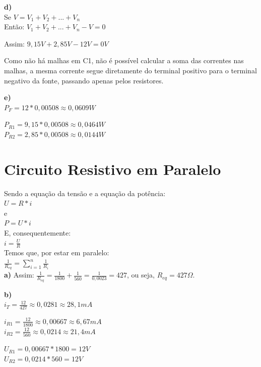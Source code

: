 \documentclass[
		12pt, %
		oneside, %
		a4paper, %
		article, %
		chapter=TITLE, %
		section=TITLE, %
		subsection=TITLE, %
		english, %
		spanish, %
		brazil %
]{abntex2} %
\numberwithin{equation}{section}
\numberwithin{figure}{section}
\numberwithin{table}{section}
\begin{document}
	\textbf{d)} \\
	Se $V = V_1 + V_2 + ... + V_n$ \\
	Então: $V_1 + V_2 + ... + V_n - V = 0$

	Assim: $9,15V + 2,85V - 12V = 0V$

	Como não há malhas em C1, não é possível calcular a soma das correntes nas malhas, a mesma corrente segue diretamente do terminal positivo para o terminal negativo da fonte, passando apenas pelos resistores.
	\linebreak

	\textbf{e)} \\
	$P_F = 12 * 0,00508 \approx 0,0609 W$

	$P_{R1} = 9,15 * 0,00508 \approx 0,0464 W$ \\
	$P_{R2} = 2,85 * 0,00508 \approx 0,0144 W$


	\newpage

	\chapter{Circuito Resistivo em Paralelo}

	\flushleft
	Sendo a equação da tensão e a equação da potência: \\
	\center
	$U = R*i$ \\
	e \\
	$P = U*i$ \\
	\flushleft
	E, consequentemente: \\
	\center
	$i = \frac{U}{R}$ \\
	\flushleft
	Temos que, por estar em paralelo: \\
	\center
	$\frac{1}{R_{eq}} = \sum_{i=1}^{n}  \frac{1}{R_i}$ \\


	\flushleft
	\textbf{a)} Assim: $\frac{1}{R_{eq}} = \frac{1}{1800} + \frac{1}{560} = \frac{1}{0,0023} = 427$, ou seja, $R_{eq} = 427 \Omega$.
	\linebreak

	\textbf{b)} \\
	$i_T = \frac{12}{427} \approx 0,0281 \approx 28,1 mA$

	$i_{R1} =  \frac{12}{1800} \approx 0,00667 \approx 6,67 mA$ \\
	$i_{R2} =   \frac{12}{560} \approx 0,0214 \approx 21,4 mA$

	$U_{R1} =  0,00667 * 1800 = 12V$ \\
	$U_{R2} =  0,0214 * 560 = 12V$
	\linebreak
\end{document}
